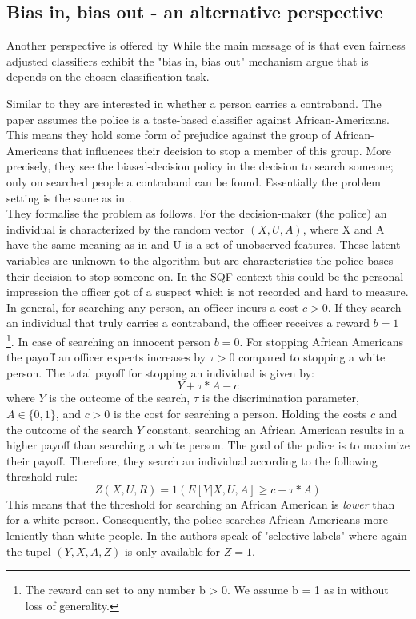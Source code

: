 \subsection*{Bias in, bias out - an alternative perspective}

Another perspective is offered by \cite{RambachanBBOEFW}
While the main message of \cite{kallus2018} is that even fairness adjusted classifiers exhibit the "bias in, bias out" mechanism \cite{RambachanBBOEFW} argue that is depends on the chosen classification task.

Similar to \cite{kallus2018} they are interested in whether a person carries a contraband. The paper assumes the police is a taste-based classifier against African-Americans. This means they hold some form of prejudice against the group of African-Americans that influences their decision to stop a member of this group. More precisely, they see the biased-decision policy in the decision to search someone; only on searched people a contraband can be found. Essentially the problem setting is the same as in \cite{kallus2018}.\\

They formalise the problem as follows. For the decision-maker (the police) an individual is characterized by the random vector $(X, U, A)$, where X and A have the same meaning as in \cite{kallus2018}
and U is a set of unobserved features. These latent variables are unknown to the algorithm but are characteristics the police bases their decision to stop someone on. In the SQF context this could be the personal impression the officer got of a suspect which is not recorded and hard to measure.
In general, for searching any person, an officer incurs a cost $c > 0$. If they search an individual that truly carries a contraband, the officer receives a reward $b = 1$ \footnote{The reward can set to any number b > 0. We assume b = 1 as in \cite{RambachanBBOEFW} without loss of generality.}. In case of searching an innocent person $b = 0$.
For stopping African Americans the payoff an officer expects increases by $\tau > 0$ compared to stopping a white person. The total payoff for stopping an individual is given by:
$$Y + \tau * A - c$$
where $Y$ is the outcome of the search, $\tau$ is the discrimination parameter, $A \in \{0,1\}$, and $c > 0$ is the cost for searching a person.
Holding the costs $c$ and the outcome of the search $Y$ constant, searching an African American results in a higher payoff than searching a white person. The goal of the police is to maximize their payoff. Therefore, they search an individual according to the following threshold rule:
$$Z(X, U, R) = 1(E[Y|X, U, A] \ge c - \tau * A)$$
This means that the threshold for searching an African American is \textit{lower} than for a white person. Consequently, the police searches African Americans more leniently than white people.
In \cite{RambachanBBOEFW} the authors speak of "selective labels" where again the tupel $(Y, X, A, Z)$ is only available for $Z = 1$. \\


